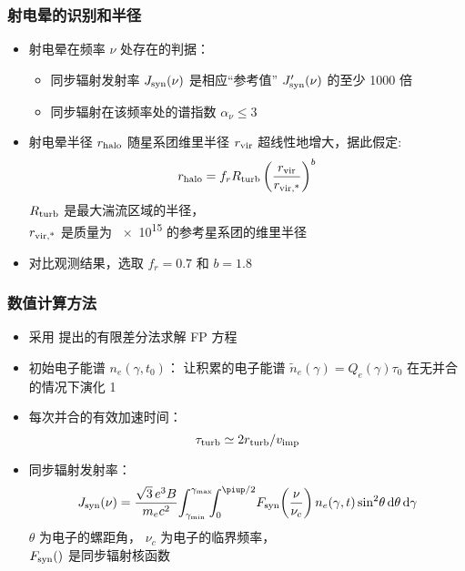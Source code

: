 \documentclass{beamer}
\begin{document}
\begin{frame}[subsec]
  \frametitle{射电晕的识别和半径}
  \begin{itemize}
    \item 射电晕在频率 $\nu$ 处存在的判据：
      \begin{itemize}
        \item 同步辐射发射率 $J_{\text{syn}}(\nu)$
          是相应\enquote{参考值} $J'_{\text{syn}}(\nu)$ 的至少 1000 倍
        \item 同步辐射在该频率处的谱指数 $\alpha_{\nu} \le 3$
      \end{itemize}

    \item 射电晕半径 $r_{\text{halo}}$ 随星系团维里半径 $r_{\text{vir}}$
      超线性地增大，据此假定:
      \begin{equation}
        r_{\text{halo}} = f_r R_{\text{turb}}
          \left( \frac{r_{\text{vir}}}{r_{\text{vir,*}}} \right)^b
      \end{equation}
      $R_{\text{turb}}$ 是最大湍流区域的半径，\\
      $r_{\text{vir,*}}$ 是质量为 \SI{e15}{\solarmass} 的参考星系团的维里半径
    \item 对比观测结果，选取 $f_r = 0.7$ 和 $b = 1.8$
  \end{itemize}
\end{frame}

\begin{frame}[subsec]
  \frametitle{数值计算方法}
  \begin{itemize}
    \item 采用 \cite{chang1970} 提出的有限差分法求解 FP 方程
    \item 初始电子能谱 $n_e(\gamma, t_0)$：
      让积累的电子能谱 $\tilde{n}_e(\gamma) = Q_e(\gamma) \tau_0$
      在无并合的情况下演化 \SI{1}{\Gyr}
    \item 每次并合的有效加速时间：
      \begin{equation}
        \tau_{\text{turb}} \simeq 2 r_{\text{turb}} / v_{\text{imp}}
      \end{equation}
    \item 同步辐射发射率：
      \begin{equation}
        J_{\R{syn}}(\nu) =
          \frac{\sqrt{3} \,e^3 B}{m_e c^2}
          \!\int_{\gamma_{\R{min}}}^{\gamma_{\R{max}}}
          \!\!\!\int_0^{\Cpi/2}
          \! F_{\R{syn}} \!\left( \frac{\nu}{\nu_c} \right)
          n_e(\gamma, t) \sin^2 \!\theta \,\D{\theta} \,\D{\gamma}
      \end{equation}
      $\theta$ 为电子的螺距角，
      $\nu_c$ 为电子的临界频率，\\
      $F_{\text{syn}}()$ 是同步辐射核函数
  \end{itemize}
\end{frame}
\end{document}
